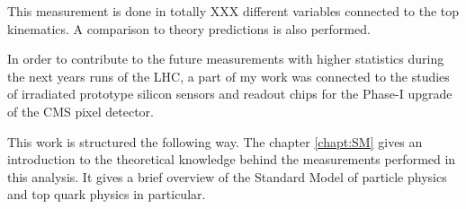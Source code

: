 This measurement is done in totally XXX different variables
connected to the top kinematics. A comparison to theory predictions is also performed.

In order to contribute to the future measurements with higher statistics during
the next years runs of the LHC, a part of my work was connected to the studies of irradiated
prototype silicon sensors and readout chips for the Phase-I upgrade of the CMS pixel detector.

This work is structured the following way. The chapter \ref{chapt:SM} gives an introduction to the theoretical
knowledge behind the measurements performed in this analysis. It gives a brief overview of the Standard
Model of particle physics and top quark physics in particular.